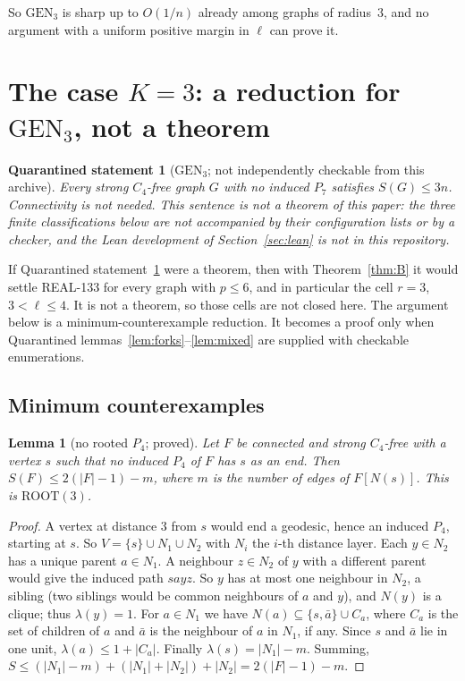\documentclass[11pt]{amsart}
\newtheorem{lemma}[theorem]{Lemma}
\newtheorem{qrecord}[theorem]{Quarantined statement}
\theoremstyle{definition}
\theoremstyle{remark}
\newcommand{\lr}{\ell}
\newcommand{\pp}{p}
\newcommand{\GEN}{\mathrm{GEN}}
\newcommand{\ROOT}{\mathrm{ROOT}}
\begin{document}
So $\GEN_3$ is sharp up to $O(1/n)$ already among graphs of radius~$3$, and no argument with a uniform positive margin in $\lr$ can prove it.

\section{The case \texorpdfstring{$K=3$}{K=3}: a reduction for \texorpdfstring{$\GEN_3$}{GEN3}, not a theorem}\label{sec:gen3}

\begin{qrecord}[$\GEN_3$; not independently checkable from this archive]\label{thm:gen3}
Every strong $C_4$-free graph $G$ with no induced $P_7$ satisfies $S(G)\le3n$. Connectivity is not needed. This sentence is not a theorem of this paper: the three finite classifications below are not accompanied by their configuration lists or by a checker, and the Lean development of Section~\ref{sec:lean} is not in this repository.
\end{qrecord}

If Quarantined statement~\ref{thm:gen3} were a theorem, then with Theorem~\ref{thm:B} it would settle REAL-133 for every graph with $\pp\le6$, and in particular the cell $r=3$, $3<\lr\le4$. It is not a theorem, so those cells are not closed here. The argument below is a minimum-counterexample reduction. It becomes a proof only when Quarantined lemmas~\ref{lem:forks}--\ref{lem:mixed} are supplied with checkable enumerations.

\subsection{Minimum counterexamples}
\begin{lemma}[no rooted $P_4$; proved]\label{lem:rootedp4}
Let $F$ be connected and strong $C_4$-free with a vertex $s$ such that no induced $P_4$ of $F$ has $s$ as an end. Then $S(F)\le2(|F|-1)-m$, where $m$ is the number of edges of $F[N(s)]$. This is $\ROOT(3)$.
\end{lemma}

\begin{proof}
A vertex at distance $3$ from $s$ would end a geodesic, hence an induced $P_4$, starting at $s$. So $V=\{s\}\cup N_1\cup N_2$ with $N_i$ the $i$-th distance layer. Each $y\in N_2$ has a unique parent $a\in N_1$. A neighbour $z\in N_2$ of $y$ with a different parent would give the induced path $sayz$. So $y$ has at most one neighbour in $N_2$, a sibling (two siblings would be common neighbours of $a$ and $y$), and $N(y)$ is a clique; thus $\lambda(y)=1$. For $a\in N_1$ we have $N(a)\subseteq\{s,\bar a\}\cup C_a$, where $C_a$ is the set of children of $a$ and $\bar a$ is the neighbour of $a$ in $N_1$, if any. Since $s$ and $\bar a$ lie in one unit, $\lambda(a)\le1+|C_a|$. Finally $\lambda(s)=|N_1|-m$. Summing, $S\le(|N_1|-m)+(|N_1|+|N_2|)+|N_2|=2(|F|-1)-m$.
\end{proof}
\end{document}
